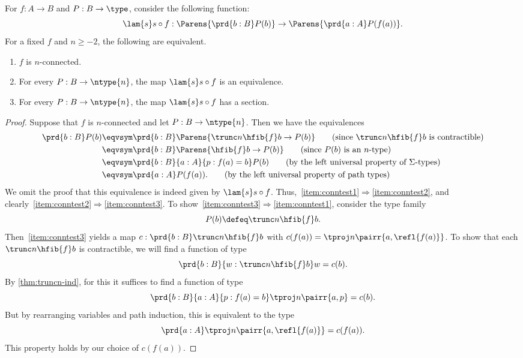 \begin{lem}\label{prop:nconnected_tested_by_lv_n_dependent types}
For $f:A\to B$ and $P:B\to\type$, consider the following function:
\begin{equation*}
\lam{s} s\circ f :\Parens{\prd{b:B} P(b)}\to\Parens{\prd{a:A}P(f(a))}.
\end{equation*}
For a fixed $f$ and $n\ge -2$, the following are equivalent.
\begin{enumerate}
\item $f$ is $n$-connected.\label{item:conntest1}
\item For every $P:B\to\ntype{n}$, the map $\lam{s} s\circ f$ is an equivalence.\label{item:conntest2}
\item For every $P:B\to\ntype{n}$, the map $\lam{s} s\circ f$ has a section.\label{item:conntest3}
\end{enumerate}
\end{lem}

\begin{proof}
Suppose that $f$ is $n$-connected and let $P:B\to\ntype{n}$. Then we have the equivalences
\begin{align}
  \prd{b:B} P(b) & \eqvsym \prd{b:B} \Parens{\trunc n{\hfib{f}b} \to P(b)}
  \tag{since $\trunc n{\hfib{f}b}$ is contractible}\\
  & \eqvsym \prd{b:B} \Parens{\hfib{f}b\to P(b)}
  \tag{since $P(b)$ is an $n$-type}\\
  & \eqvsym \prd{b:B}{a:A}{p:f(a)= b} P(b)
  \tag{by the left universal property of $\Sigma$-types}\\
  & \eqvsym \prd{a:A} P(f(a)).
  \tag{by the left universal property of path types}
\end{align}
We omit the proof that this equivalence is indeed given by $\lam{s} s\circ f$.
Thus,~\ref{item:conntest1}$\Rightarrow$\ref{item:conntest2}, and clearly~\ref{item:conntest2}$\Rightarrow$\ref{item:conntest3}.
To show~\ref{item:conntest3}$\Rightarrow$\ref{item:conntest1}, consider the type family
\begin{equation*}
P(b)\defeq \trunc n{\hfib{f}b}.
\end{equation*}
Then~\ref{item:conntest3} yields a map $c:\prd{b:B} \trunc n{\hfib{f}b}$ with
$c(f(a))=\tproj n{\pairr{a,\refl{f(a)}}}$. To show that each $\trunc n{\hfib{f}b}$ is contractible,
we will find a function of type
\begin{equation*}
\prd{b:B}{w:\trunc n{\hfib{f}b}} w= c(b).
\end{equation*}
By \cref{thm:truncn-ind}, for this it suffices to find a function of type
\begin{equation*}
\prd{b:B}{a:A}{p:f(a)= b} \tproj n{\pairr{a,p}}= c(b).
\end{equation*}
But by rearranging variables and path induction, this is equivalent to the type
\begin{equation*}
\prd{a:A} \tproj n{\pairr{a,\refl{f(a)}}}= c(f(a)).
\end{equation*}
This property holds by our choice of $c(f(a))$.
\end{proof}

